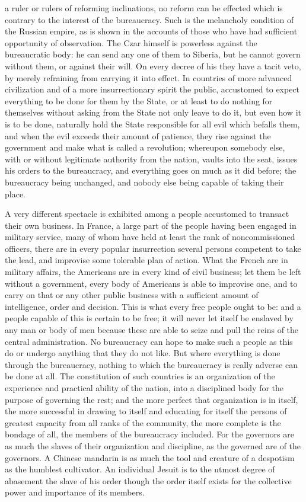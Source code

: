 \documentclass[12pt]{report}
\begin{document}
a ruler or rulers of reforming inclinations, no reform can be effected which is contrary to the interest of the bureaucracy. Such is the melancholy condition of the Russian empire, as is shown in the accounts of those who have had sufficient opportunity of observation. The Czar himself is powerless against the bureaucratic body: he can send any one of them to Siberia, but he cannot govern without them, or against their will. On every decree of his they have a tacit veto, by merely refraining from carrying it into effect. In countries of more advanced civilization and of a more insurrectionary spirit the public, accustomed to expect everything to be done for them by the State, or at least to do nothing for themselves without asking from the State not only leave to do it, but even how it is to be done, naturally hold the State responsible for all evil which befalls them, and when the evil exceeds their amount of patience, they rise against the government and make what is called a revolution; whereupon somebody else, with or without legitimate authority from the nation, vaults into the seat, issues his orders to the bureaucracy, and everything goes on much as it did before; the bureaucracy being unchanged, and nobody else being capable of taking their place.

A very different spectacle is exhibited among a people accustomed to transact their own business. In France, a large part of the people having been engaged in military service, many of whom have held at least the rank of noncommissioned officers, there are in every popular insurrection several persons competent to take the lead, and improvise some tolerable plan of action. What the French are in military affairs, the Americans are in every kind of civil business; let them be left without a government, every body of Americans is able to improvise one, and to carry on that or any other public business with a sufficient amount of intelligence, order and decision. This is what every free people ought to be: and a people capable of this is certain to be free; it will never let itself be enslaved by any man or body of men because these are able to seize and pull the reins of the central administration. No bureaucracy can hope to make such a people as this do or undergo anything that they do not like. But where everything is done through the bureaucracy, nothing to which the bureaucracy is really adverse can be done at all. The constitution of such countries is an organization of the experience and practical ability of the nation, into a disciplined body for the purpose of governing the rest; and the more perfect that organization is in itself, the more successful in drawing to itself and educating for itself the persons of greatest capacity from all ranks of the community, the more complete is the bondage of all, the members of the bureaucracy included. For the governors are as much the slaves of their organization and discipline, as the governed are of the governors. A Chinese mandarin is as much the tool and creature of a despotism as the humblest cultivator. An individual Jesuit is to the utmost degree of abasement the slave of his order though the order itself exists for the collective power and importance of its members.
\end{document}
